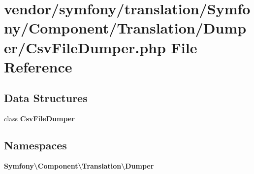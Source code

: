 \section{vendor/symfony/translation/\+Symfony/\+Component/\+Translation/\+Dumper/\+Csv\+File\+Dumper.php File Reference}
\label{_csv_file_dumper_8php}
\subsection*{Data Structures}
\begin{DoxyCompactItemize}
\item 
class {\bf Csv\+File\+Dumper}
\end{DoxyCompactItemize}
\subsection*{Namespaces}
\begin{DoxyCompactItemize}
\item 
 {\bf Symfony\textbackslash{}\+Component\textbackslash{}\+Translation\textbackslash{}\+Dumper}
\end{DoxyCompactItemize}

